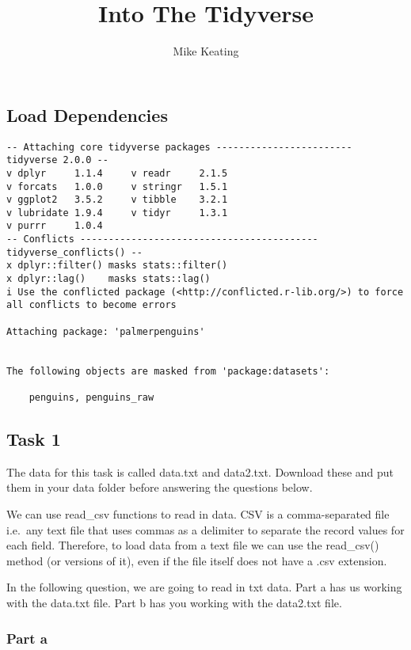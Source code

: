 \documentclass[
  letterpaper,
  DIV=11,
  numbers=noendperiod]{scrartcl}
\title{Into The Tidyverse}
\author{Mike Keating}
\date{}
\begin{document}
\maketitle


\subsection{Load Dependencies}\label{load-dependencies}

\begin{verbatim}
-- Attaching core tidyverse packages ------------------------ tidyverse 2.0.0 --
v dplyr     1.1.4     v readr     2.1.5
v forcats   1.0.0     v stringr   1.5.1
v ggplot2   3.5.2     v tibble    3.2.1
v lubridate 1.9.4     v tidyr     1.3.1
v purrr     1.0.4     
-- Conflicts ------------------------------------------ tidyverse_conflicts() --
x dplyr::filter() masks stats::filter()
x dplyr::lag()    masks stats::lag()
i Use the conflicted package (<http://conflicted.r-lib.org/>) to force all conflicts to become errors

Attaching package: 'palmerpenguins'


The following objects are masked from 'package:datasets':

    penguins, penguins_raw
\end{verbatim}

\subsection{Task 1}\label{task-1}

The data for this task is called data.txt and data2.txt. Download these
and put them in your data folder before answering the questions below.

We can use read\_csv functions to read in data. CSV is a comma-separated
file i.e.~any text file that uses commas as a delimiter to separate the
record values for each field. Therefore, to load data from a text file
we can use the read\_csv() method (or versions of it), even if the file
itself does not have a .csv extension.

In the following question, we are going to read in txt data. Part a has
us working with the data.txt file. Part b has you working with the
data2.txt file.

\subsubsection{Part a}\label{part-a}
\end{document}
